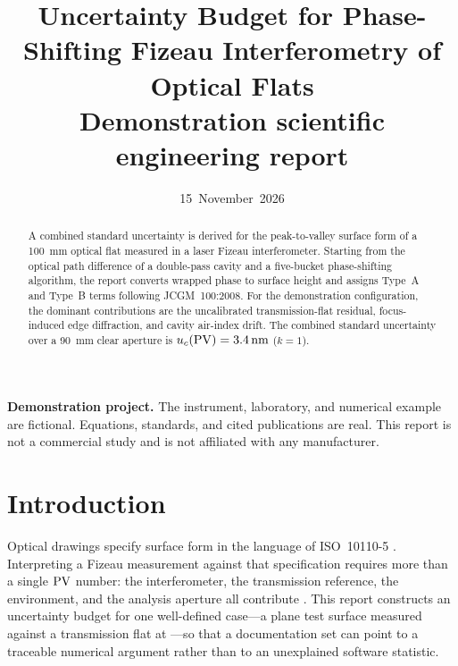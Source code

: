 

\title{\textbf{Uncertainty Budget for Phase-Shifting Fizeau Interferometry of Optical Flats}\\[0.6em]
\large Demonstration scientific engineering report}
\author{\docowner}
\date{15~November~2026}


\maketitle

\begin{tcolorbox}[colback=black!4, colframe=black, boxrule=0.6pt]
\textbf{Demonstration project.} The instrument, laboratory, and numerical example are fictional. Equations, standards, and cited publications are real. This report is not a commercial study and is not affiliated with any manufacturer.
\end{tcolorbox}

\begin{abstract}
\noindent
A combined standard uncertainty is derived for the peak-to-valley surface form of a \SI{100}{\milli\meter} optical flat measured in a laser Fizeau interferometer. Starting from the optical path difference of a double-pass cavity and a five-bucket phase-shifting algorithm, the report converts wrapped phase to surface height and assigns Type~A and Type~B terms following JCGM~100:2008. For the demonstration configuration, the dominant contributions are the uncalibrated transmission-flat residual, focus-induced edge diffraction, and cavity air-index drift. The combined standard uncertainty over a \SI{90}{\milli\meter} clear aperture is \(u_c(\mathrm{PV})=\SI{3.4}{\nano\meter}\) (\(k=1\)).
\end{abstract}

\section{Introduction}

Optical drawings specify surface form in the language of ISO~10110-5 \cite{iso10110-5}. Interpreting a Fizeau measurement against that specification requires more than a single \(\mathrm{PV}\) number: the interferometer, the transmission reference, the environment, and the analysis aperture all contribute \cite{iso14999-4,malacara2007}. This report constructs an uncertainty budget for one well-defined case---a plane test surface measured against a transmission flat at \wavelength---so that a documentation set can point to a traceable numerical argument rather than to an unexplained software statistic.

